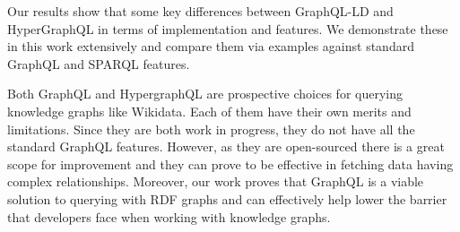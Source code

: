 \documentclass[12 pt, a4paper]{report}
\theoremstyle{definition}
\begin{document}
Our results show that some key differences between GraphQL-LD and HyperGraphQL in terms of implementation and features. We demonstrate these in this work extensively and compare them via examples against standard GraphQL and SPARQL features.

Both GraphQL and HypergraphQL are prospective choices for querying knowledge graphs like Wikidata. Each of them have their own merits and limitations. Since they are both work in progress, they do not have all the standard GraphQL features. However, as they are open-sourced there is a great scope for improvement and they can prove to be effective in fetching data having complex relationships. Moreover, our work proves that GraphQL is a viable solution to querying with RDF graphs and can effectively help lower the barrier that developers face when working with knowledge graphs.



\tableofcontents
\newpage
\listoffigures
\newpage
\listoftables
\newpage
\lstlistoflistings
{}
\newpage
\pagebreak

{}



\pagebreak



\pagebreak



\pagebreak



\pagebreak



\pagebreak


\singlespacing




\end{document}
